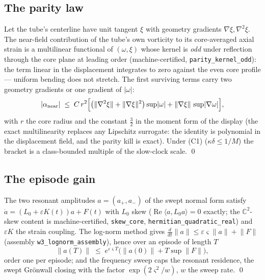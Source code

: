 \documentclass[11pt,letterpaper]{amsart}
\theoremstyle{definition}
\theoremstyle{remark}
\newcommand{\om}{\omega}
\newcommand{\norm}[1]{\lVert #1 \rVert}
\newcommand{\abs}[1]{\lvert #1 \rvert}
\begin{document}
\subsection{The parity law}\label{pf:w2}
Let the tube's centerline have unit tangent $\xi$ with geometry gradients
$\nabla\xi,\nabla^2\xi$. The near-field contribution of the tube's own vorticity to
its core-averaged axial strain is a multilinear functional of
$(\om,\xi)$ whose kernel is \emph{odd} under reflection through the core plane at
leading order (machine-certified, \texttt{parity\_kernel\_odd}): the term linear in
the displacement integrates to zero against the even core profile --- uniform bending
does not stretch. The first surviving terms carry two geometry gradients or one
gradient of $\abs{\om}$:
\[
\abs{\alpha_{\mathrm{near}}}\;\le\;C\,r^2\Bigl[\bigl(\norm{\nabla^2\xi}
+\norm{\nabla\xi}^2\bigr)\sup\abs{\om}+\norm{\nabla\xi}\,\sup\abs{\nabla\om}\Bigr],
\]
with $r$ the core radius and the constant $\tfrac32$ in the moment form of the display
(the exact multilinearity replaces any Lipschitz surrogate: the identity is
polynomial in the displacement field, and the parity kill is exact). Under (C1)
($\kappa\delta\le1/M$) the bracket is a class-bounded multiple of the slow-clock
scale. \qed

\subsection{The episode gain}\label{pf:w3}
The two resonant amplitudes $a=(a_+,a_-)$ of the swept normal form satisfy
$\dot a=(L_0+\varepsilon K(t))a+F(t)$ with $L_0$ skew ($\operatorname{Re}\langle
a,L_0a\rangle=0$ exactly; the $\mathbb{C}^2$-skew content is machine-certified,
\texttt{skew\_core}, \texttt{hermitian\_quadratic\_real}) and $\varepsilon K$ the
strain coupling. The log-norm method gives
$\tfrac{d}{dt}\norm{a}\le\varepsilon\varsigma\norm{a}+\norm{F}$
(assembly \texttt{w3\_lognorm\_assembly}), hence over an episode of length $T$
\[
\norm{a(T)}\;\le\;e^{\varepsilon\varsigma T}\bigl(\norm{a(0)}+T\sup\norm{F}\bigr),
\]
order one per episode; and the frequency sweep caps the resonant residence, the swept
Gr\"onwall closing with the factor $\exp(2\varsigma^2/w)$, $w$ the sweep rate. \qed
\end{document}
